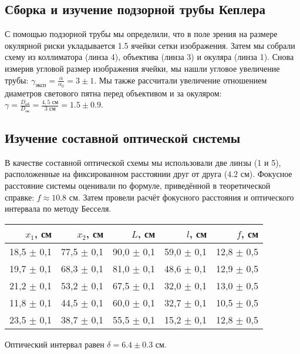 \subsection*{Сборка и изучение подзорной трубы Кеплера}
С помощью подзорной трубы мы определили, что в поле зрения на размере окулярной риски укладывается 1.5 ячейки сетки изображения. Затем мы собрали схему из коллиматора (линза 4), объектива (линза 3) и окуляра (линза 1). Снова измерив угловой размер изображения ячейки, мы нашли угловое увеличение трубы: $\gamma_{\text{эксп}} = \frac{\alpha}{\alpha_0} = 3 \pm 1$. Мы также рассчитали увеличение отношением диаметров светового пятна перед объективом и за окуляром: $\gamma = \frac{D_{\text{об}}}{D_{\text{ок}}} = \frac{4,5 \text{ см}}{3 \text{ см}} = 1.5 \pm 0.9$.

\subsection*{Изучение составной оптической системы}
В качестве составной оптической схемы мы использовали две линзы (1 и 5), расположенные на фиксированном расстоянии друг от друга ($4.2$ см). Фокусное расстояние системы оценивали по формуле, приведённой в теоретической справке: $f \approx 10.8$ см. Затем провели расчёт фокусного расстояния и оптического интервала по методу Бесселя.

\begin{table}[H]
\centering
\begin{tabular}{|r|r|r|r|r|}
\hline
$x_1$, см & $x_2$, см & $L$, см & $l$, см & $f$, см        \\ \hline \hline
18,5  $\pm$ 0,1  & 77,5  $\pm$ 0,1  & 90,0 $\pm$ 0,1    & 59,0 $\pm$ 0,1    & 12,8  $\pm$ 0,5 \\ \hline
19,7 $\pm$ 0,1   & 68,3 $\pm$ 0,1   & 81,0 $\pm$ 0,1    & 48,6 $\pm$ 0,1  & 12,9 $\pm$ 0,5    \\ \hline
21,2 $\pm$ 0,1   & 53,2 $\pm$ 0,1   & 67,5 $\pm$ 0,1  & 32,0 $\pm$ 0,1    & 13,0 $\pm$ 0,5 \\ \hline
11,8 $\pm$ 0,1   & 44,5 $\pm$ 0,1   & 60,0 $\pm$ 0,1    & 32,7 $\pm$ 0,1  & 10,5 $\pm$ 0,5 \\ \hline
23,5 $\pm$ 0,1   & 38,7 $\pm$ 0,1   & 55,5 $\pm$ 0,1  & 15,2 $\pm$ 0,1  & 12,8 $\pm$ 0,5 \\ \hline
\end{tabular}
\end{table}

\n
Оптический интервал равен $\delta = 6.4 \pm 0.3$ см.

